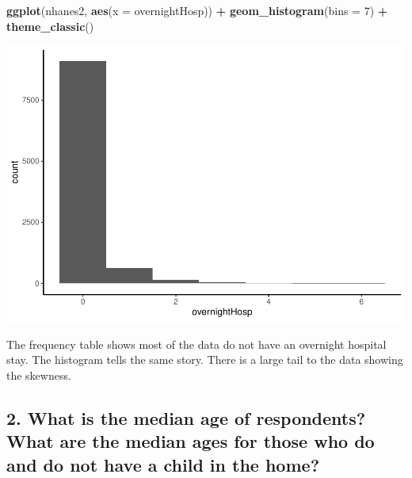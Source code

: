 \documentclass[]{article}
\newenvironment{Shaded}{\begin{snugshade}}{\end{snugshade}}
\newcommand{\DataTypeTok}[1]{\textcolor[rgb]{0.13,0.29,0.53}{#1}}
\newcommand{\DecValTok}[1]{\textcolor[rgb]{0.00,0.00,0.81}{#1}}
\newcommand{\KeywordTok}[1]{\textcolor[rgb]{0.13,0.29,0.53}{\textbf{#1}}}
\newcommand{\NormalTok}[1]{#1}
\newcommand{\OperatorTok}[1]{\textcolor[rgb]{0.81,0.36,0.00}{\textbf{#1}}}
\newcommand{\StringTok}[1]{\textcolor[rgb]{0.31,0.60,0.02}{#1}}
\begin{document}
\begin{Shaded}
\begin{Highlighting}[]
\KeywordTok{ggplot}\NormalTok{(nhanes2, }\KeywordTok{aes}\NormalTok{(}\DataTypeTok{x =}\NormalTok{ overnightHosp)) }\OperatorTok{+}
\StringTok{  }\KeywordTok{geom_histogram}\NormalTok{(}\DataTypeTok{bins =} \DecValTok{7}\NormalTok{) }\OperatorTok{+}
\StringTok{  }\KeywordTok{theme_classic}\NormalTok{()}
\end{Highlighting}
\end{Shaded}

\includegraphics{assignment2_files/figure-latex/q1_hist-1.pdf}

The frequency table shows most of the data do not have an overnight
hospital stay. The histogram tells the same story. There is a large tail
to the data showing the skewness.

\hypertarget{what-is-the-median-age-of-respondents-what-are-the-median-ages-for-those-who-do-and-do-not-have-a-child-in-the-home}{%
\subsection{2. What is the median age of respondents? What are the
median ages for those who do and do not have a child in the
home?}\label{what-is-the-median-age-of-respondents-what-are-the-median-ages-for-those-who-do-and-do-not-have-a-child-in-the-home}}

\begin{Shaded}
\end{Shaded}
\end{document}
